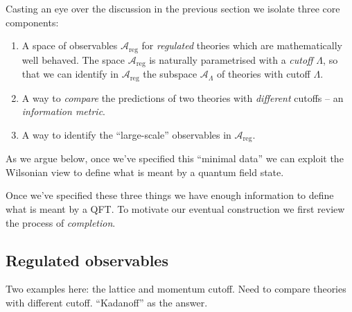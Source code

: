 \documentclass[11pt]{amsart}
\theoremstyle{plain}%
\theoremstyle{definition}
\theoremstyle{remark}
\begin{document}
Casting an eye over the discussion in the previous section we isolate three core components:
\begin{enumerate}
	\item A space of observables $\mathcal{A}_{\text{reg}}$ for \emph{regulated} theories which are mathematically well behaved. The space $\mathcal{A}_{\text{reg}}$ is naturally parametrised with a \emph{cutoff} $\Lambda$, so that we can identify in $\mathcal{A}_{\text{reg}}$ the subspace $\mathcal{A}_{\Lambda}$ of theories with cutoff $\Lambda$.
	\item A way to \emph{compare} the predictions of two theories with \emph{different} cutoffs -- an \emph{information metric}.
	\item A way to identify the ``large-scale'' observables in $\mathcal{A}_{\text{reg}}$.
\end{enumerate}  
As we argue below, once we've specified this ``minimal data'' we can exploit the Wilsonian view to define what is meant by a quantum field state.  
   

Once we've specified these three things we have enough information to define what is meant by a QFT. To motivate our eventual construction we first review the process of \emph{completion}.

\subsection{Regulated observables}

Two examples here: the lattice and momentum cutoff. Need to compare theories with different cutoff. ``Kadanoff'' as the answer. 
\end{document}
